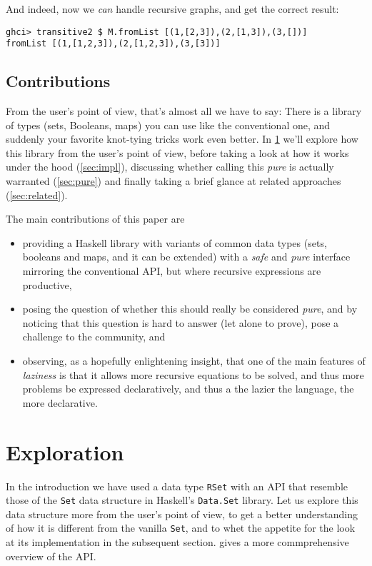 \documentclass[manuscript,screen,acmsmall]{acmart}
\begin{document}
And indeed, now we \emph{can} handle recursive graphs, and get the correct result:
\begin{verbatim}
ghci> transitive2 $ M.fromList [(1,[2,3]),(2,[1,3]),(3,[])]
fromList [(1,[1,2,3]),(2,[1,2,3]),(3,[3])]
\end{verbatim}

\subsection{Contributions}

From the user’s point of view, that’s almost all we have to say: There is a library of types (sets, Booleans, maps) you can use like the conventional one, and suddenly your favorite knot-tying tricks work even better. In \cref{sec:exploration} we'll explore how this library from the user's point of view, before taking a look at how it works under the hood (\cref{sec:impl}), discussing whether calling this \emph{pure} is actually warranted (\cref{sec:pure}) and finally taking a brief glance at related approaches (\cref{sec:related}).

The main contributions of this paper are
\begin{itemize}
\item providing a Haskell library with variants of common data types (sets, booleans and maps, and it can be extended) with a \emph{safe} and \emph{pure} interface mirroring the conventional API, but where recursive expressions are productive,
\item posing the question of whether this should really be considered \emph{pure}, and by noticing that this question is hard to answer (let alone to prove), pose a challenge to the community, and
\item observing, as a hopefully enlightening insight, that one of the main features of \emph{laziness} is that it allows more recursive equations to be solved, and thus more problems be expressed declaratively, and thus a the lazier the language, the more declarative.
\end{itemize}

\section{Exploration}\label{sec:exploration}

In the introduction we have used a data type \verb|RSet| with an API that resemble those of the \verb|Set| data structure in Haskell's \verb|Data.Set| library. Let us explore this data structure more from the user's point of view, to get a better understanding of how it is different from the vanilla \verb|Set|, and to whet the appetite for the look at its implementation in the subsequent section.
 gives a more commprehensive overview of the API.
\end{document}
